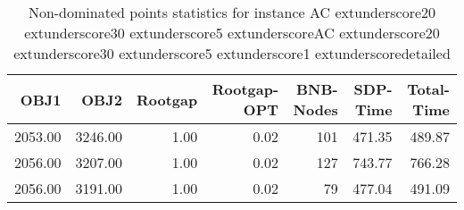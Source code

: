 \begin{table}
\caption{Non-dominated points statistics for instance AC	extunderscore20	extunderscore30	extunderscore5	extunderscoreAC	extunderscore20	extunderscore30	extunderscore5	extunderscore1	extunderscoredetailed}
\label{tab:stats/AC_20_30_5_AC_20_30_5_1_detailed}
\begin{tabular}{rrrrrrr}
\toprule
OBJ1 & OBJ2 & Rootgap & Rootgap-OPT & BNB-Nodes & SDP-Time & Total-Time \\
\midrule
2053.00 & 3246.00 & 1.00 & 0.02 & 101 & 471.35 & 489.87 \\
2056.00 & 3207.00 & 1.00 & 0.02 & 127 & 743.77 & 766.28 \\
2056.00 & 3191.00 & 1.00 & 0.02 & 79 & 477.04 & 491.09 \\
\bottomrule
\end{tabular}
\end{table}
